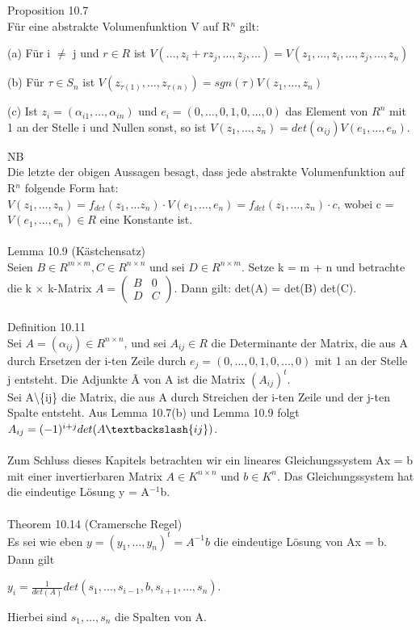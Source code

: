 \documentclass[fontsize=10pt]{scrartcl}
\begin{document}
Proposition 10.7\\
Für eine abstrakte Volumenfunktion V auf R$^n$ gilt:
\begin{compactenum}
\item[(a)] Für i $\neq$ j und $r \in R$ ist $V(…, z_i + rz_j, …, z_j, …) = V(z_1, …, z_i, …, z_j, …, z_n)$
\item[(b)] Für $\tau \in S_n$ ist $V(z_{\tau(1)}, …, z_{\tau(n)}) = sgn(\tau)V(z_1, …, z_n)$
\item[(c)] Ist $z_i = (\alpha_{i1}, …, \alpha_{in})$ und $e_i = (0, …, 0, 1, 0, …, 0)$ das Element von $R^n$ mit 1 an der Stelle i und Nullen sonst, so ist $V(z_1, …, z_n) = det(\alpha_{ij}) V(e_1, …, e_n)$.\\
\end{compactenum}
NB\\
Die letzte der obigen Aussagen besagt, dass jede abstrakte Volumenfunktion auf R$^n$ folgende Form hat:
$V (z_1, …, z_n) = f_{det}(z_1, … z_n) \cdot V (e_1, …, e_n) = f_{det}(z_1, …, z_n) \cdot c$, wobei c = $V (e_1,…, e_n) \in R$ eine Konstante ist.\\
\\
Lemma 10.9 (Kästchensatz)\\
Seien $B \in R^{m \times m},C \in R^{n \times n}$ und sei $D \in R^{n \times m}$. Setze k = m + n und betrachte die k $\times$ k-Matrix $A = \begin{pmatrix} B & 0 \\ D & C \end{pmatrix}$. Dann gilt: det(A) = det(B) det(C).\\
\\
\newpage
Definition 10.11\\
Sei $A = (\alpha_{ij}) \in R^{n \times n}$, und sei $A_{ij} \in R$ die Determinante der Matrix, die aus A durch Ersetzen der i-ten Zeile durch $e_j = (0,...,0,1,0,...,0)$ mit 1 an der Stelle j entsteht. Die Adjunkte \~{A} von A ist die Matrix $(A_{ij})^t$.\\
Sei A\textbackslash\{ij\} die Matrix, die aus A durch Streichen der i-ten Zeile und der j-ten Spalte entsteht. Aus Lemma 10.7(b) und Lemma 10.9 folgt $A_{ij} =(-1)^{i+j} det(A\textbackslash\{ij\})$.\\
\\
Zum Schluss dieses Kapitels betrachten wir ein lineares Gleichungssystem Ax = b mit einer invertierbaren Matrix $A \in K^{n \times n}$ und $b \in K^n$. Das Gleichungssystem hat die eindeutige Lösung y = A$^{-1}$b.\\
\\
Theorem 10.14 (Cramersche Regel)\\
Es sei wie eben $y = (y_1, …, y_n)^t = A^{-1}b$ die eindeutige Lösung von Ax = b. Dann gilt
\begin{center}
$y_i = \frac{1}{det(A)} det(s_1, …, s_{i-1}, b, s_{i+1}, …, s_n)$.
\end{center}
Hierbei sind $s_1, …, s_n$ die Spalten von A.\\
\end{document}

